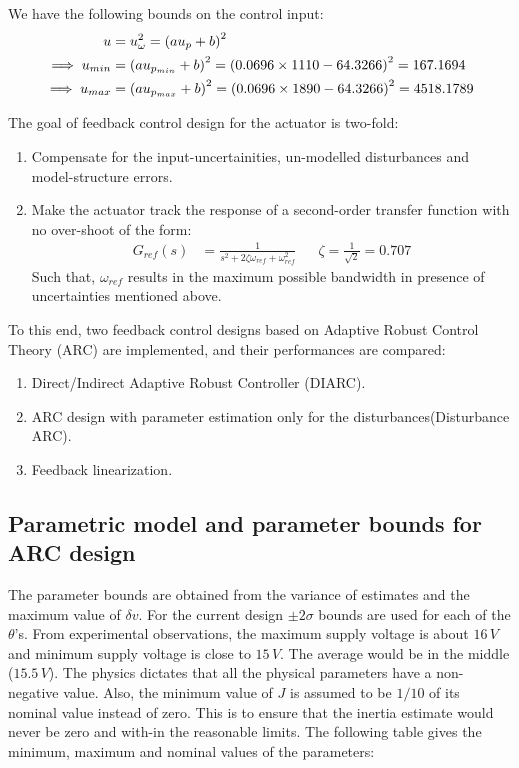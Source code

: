 We have the following bounds on the control input:
\begin{align*}
    u &= u_\omega^2 = \left( a u_p + b \right)^2\\
    \implies u_{min} &= \left( a u_{p_{min}}  + b \right)^2 = \left( 0.0696 \times 1110 - 64.3266 \right)^2 = 167.1694\\
    \implies u_{max} &= \left( a u_{p_{max}}  + b \right)^2 = \left( 0.0696 \times 1890 - 64.3266 \right)^2 = 4518.1789\\
\end{align*}

The goal of feedback control design for the actuator is two-fold:
\begin{enumerate}
\item Compensate for the input-uncertainities, un-modelled disturbances and
model-structure errors.
\item Make the actuator track the response of a second-order transfer function
with no over-shoot of the form:
\begin{align*}
    G_{ref}(s) &= \frac{1}{s^2 + 2 \zeta \omega_{ref} + \omega_{ref}^2}
    && \zeta = \frac{1}{\sqrt{2}} = 0.707
\end{align*}
Such that, $\omega_{ref}$ results in the maximum possible bandwidth in presence
of uncertainties mentioned above.
\end{enumerate}

To this end, two feedback control designs based on Adaptive Robust Control
Theory (ARC) are implemented, and their performances are compared:
\begin{enumerate}
    \item Direct/Indirect Adaptive Robust Controller (DIARC).
    \item ARC design with parameter estimation only for the disturbances(Disturbance ARC).
    \item Feedback linearization.
\end{enumerate}

\subsection{Parametric model and parameter bounds for ARC design}

The parameter bounds are obtained from the variance of estimates and the
maximum value of $\delta v$. For the current design $\pm 2\sigma$ bounds are
used for each of the $\theta$'s. From experimental observations, the maximum
supply voltage is about $16\, V$ and minimum supply voltage is close to $15\,
V$. The average would be in the middle ($15.5\, V$). The physics dictates that
all the physical parameters have a non-negative value. Also, the minimum value
of $J$ is assumed to be $1/10$ of its nominal value instead of zero. This is to
ensure that the inertia estimate would never be zero and with-in the reasonable
limits. The following table gives the minimum, maximum and nominal values of the parameters:

